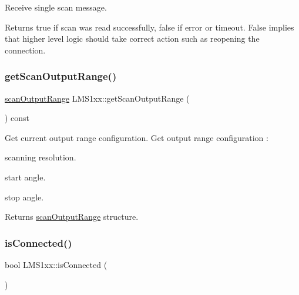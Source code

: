 Receive single scan message. 

\begin{DoxyReturn}{Returns}
true if scan was read successfully, false if error or timeout. False implies that higher level logic should take correct action such as reopening the connection. 
\end{DoxyReturn}
\mbox{\label{classLMS1xx_a89b61570421cabe5e57b2f8596c25673}} 
\subsubsection{\texorpdfstring{get\+Scan\+Output\+Range()}{getScanOutputRange()}}
{\footnotesize\ttfamily \hyperlink{structscanOutputRange}{scan\+Output\+Range} L\+M\+S1xx\+::get\+Scan\+Output\+Range (\begin{DoxyParamCaption}{ }\end{DoxyParamCaption}) const}



Get current output range configuration. Get output range configuration \+: 


\begin{DoxyItemize}
\item scanning resolution.
\item start angle.
\item stop angle. \begin{DoxyReturn}{Returns}
\hyperlink{structscanOutputRange}{scan\+Output\+Range} structure. 
\end{DoxyReturn}

\end{DoxyItemize}\mbox{\label{classLMS1xx_a8f876ce189ccbc0d5f9e6673f8b744e1}} 
\subsubsection{\texorpdfstring{is\+Connected()}{isConnected()}}
{\footnotesize\ttfamily bool L\+M\+S1xx\+::is\+Connected (\begin{DoxyParamCaption}{ }\end{DoxyParamCaption})}



